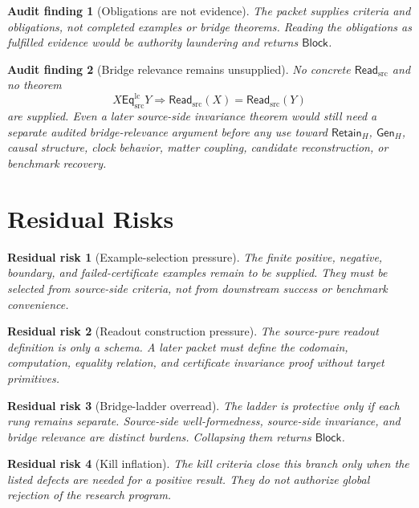 \documentclass[11pt]{article}
\newcommand{\EqLC}{\mathsf{Eq}_{\mathrm{src}}^{\mathrm{lc}}}
\newcommand{\ReadSrc}{\mathsf{Read}_{\mathrm{src}}}
\newcommand{\RetainH}{\mathsf{Retain}_{H}}
\newcommand{\GenH}{\mathsf{Gen}_{H}}
\newcommand{\Block}{\mathsf{Block}}
\newtheorem{auditfinding}{Audit finding}
\newtheorem{residualrisk}{Residual risk}
\begin{document}
\begin{auditfinding}[Obligations are not evidence]
The packet supplies criteria and obligations, not completed examples or
bridge theorems. Reading the obligations as fulfilled evidence would be
authority laundering and returns \(\Block\).
\end{auditfinding}

\begin{auditfinding}[Bridge relevance remains unsupplied]
No concrete \(\ReadSrc\) and no theorem
\[
    X\EqLC Y \Longrightarrow \ReadSrc(X)=\ReadSrc(Y)
\]
are supplied. Even a later source-side invariance theorem would still
need a separate audited bridge-relevance argument before any use toward
\(\RetainH\), \(\GenH\), causal structure, clock behavior, matter
coupling, candidate reconstruction, or benchmark recovery.
\end{auditfinding}

\section{Residual Risks}

\begin{residualrisk}[Example-selection pressure]
The finite positive, negative, boundary, and failed-certificate examples
remain to be supplied. They must be selected from source-side criteria,
not from downstream success or benchmark convenience.
\end{residualrisk}

\begin{residualrisk}[Readout construction pressure]
The source-pure readout definition is only a schema. A later packet must
define the codomain, computation, equality relation, and certificate
invariance proof without target primitives.
\end{residualrisk}

\begin{residualrisk}[Bridge-ladder overread]
The ladder is protective only if each rung remains separate. Source-side
well-formedness, source-side invariance, and bridge relevance are
distinct burdens. Collapsing them returns \(\Block\).
\end{residualrisk}

\begin{residualrisk}[Kill inflation]
The kill criteria close this branch only when the listed defects are
needed for a positive result. They do not authorize global rejection of
the research program.
\end{residualrisk}
\end{document}
